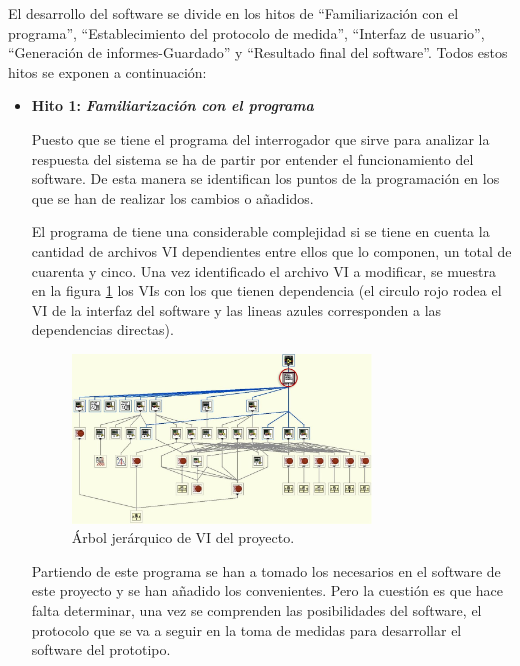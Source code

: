 El desarrollo del software se divide en los hitos de ``Familiarización con el programa'', ``Establecimiento del protocolo de medida'', ``Interfaz de usuario'', ``Generación de informes-Guardado'' y ``Resultado final del software''. Todos estos hitos se exponen a continuación:

\begin{itemize} [label=]
	\item \textbf{Hito 1:} \textit{\textbf{Familiarización con el programa}}
	
	Puesto que se tiene el programa del interrogador que sirve para analizar la respuesta del sistema se ha de partir por entender el funcionamiento del software. De esta manera se identifican los puntos de la programación en los que se han de realizar los cambios o añadidos. 
	
	El programa de tiene una considerable complejidad si se tiene en cuenta la cantidad de archivos VI dependientes entre ellos que lo componen, un total de cuarenta y cinco. Una vez identificado el archivo VI a modificar, se muestra en la figura \ref{fig:hierarchy} los VIs con los que tienen dependencia (el circulo rojo rodea el VI de la interfaz del software y las lineas azules corresponden a las dependencias directas).
	
	\begin{figure}[H]
		\centering
		\includegraphics[width=0.75\textwidth]{./img/hierarchyLV}
		\caption{Árbol jerárquico de VI del proyecto.} 
		\label{fig:hierarchy}
	\end{figure}  
	
	Partiendo de este programa se han a tomado los necesarios en el software de este proyecto y se han añadido los convenientes. Pero la cuestión es que hace falta determinar, una vez se comprenden las posibilidades del software, el protocolo que se va a seguir en la toma de medidas para desarrollar el software del prototipo. 
	

\end{itemize}
